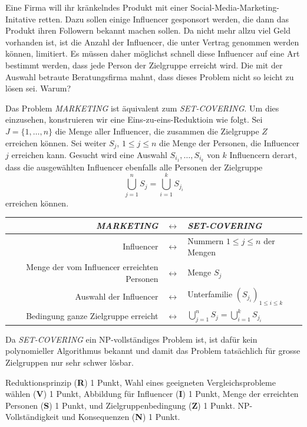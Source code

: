 Eine Firma will ihr kränkelndes Produkt mit einer
Social-Media-Marketing-Initative retten.
Dazu sollen einige Influencer gesponsort werden, die dann das Produkt
ihren Followern bekannt machen sollen.
Da nicht mehr allzu viel Geld vorhanden ist, ist die Anzahl der
Influencer, die unter Vertrag genommen werden können, limitiert.
Es müssen daher möglichst schnell diese Influencer
auf eine Art bestimmt werden, dass jede Person der Zielgruppe erreicht wird.
Die mit der Auswahl betraute Beratungsfirma mahnt, dass dieses
Problem nicht so leicht zu lösen sei.
Warum?

\begin{loesung}
Das Problem \textit{MARKETING} ist äquivalent zum \textit{SET-COVERING}.
Um dies einzusehen, konstruieren wir eine Eins-zu-eins-Reduktioin wie
folgt.
Sei $J=\{1,\dots,n\}$ die Menge aller Influencer,
die zusammen die Zielgruppe $Z$ erreichen können.
Sei weiter $S_j$, $1\le j\le n$ die Menge der Personen, die Influencer $j$
erreichen kann.
Gesucht wird eine Auswahl $S_{i_1},\dots,S_{i_k}$ von $k$ Influencern
derart, dass die ausgewählten Influencer ebenfalls alle Personen der
Zielgruppe
\[
\bigcup_{j=1}^n S_j
= 
\bigcup_{i=1}^k S_{j_i}
\]
erreichen können.
\begin{center}
\begin{tabular}{r>{$}c<{$}l}
\textit{MARKETING}&\leftrightarrow&\textit{SET-COVERING} \\
\hline
Influencer&\leftrightarrow&Nummern $1\le j\le n$ der Mengen \\
Menge der vom Influencer erreichten Personen&\leftrightarrow&Menge $S_j$ \\
Auswahl der Influencer&\leftrightarrow&Unterfamilie $(S_{j_i})_{1\le i\le k}$ \\
Bedingung ganze Zielgruppe erreicht&\leftrightarrow&
$\bigcup_{j=1}^n S_j = \bigcup_{i=1}^k S_{j_i}$
\end{tabular}
\end{center}
Da \textit{SET-COVERING} ein NP-vollständiges Problem ist, ist dafür kein 
polynomieller Algorithmus bekannt und damit das Problem tatsächlich 
für grosse Zielgruppen nur sehr schwer lösbar.
\end{loesung}

\begin{bewertung}
Reduktionsprinzip ({\bf R}) 1 Punkt,
Wahl eines geeigneten Vergleichsprobleme wählen ({\bf V}) 1 Punkt,
Abbildung für Influencer ({\bf I}) 1 Punkt,
Menge der erreichten Personen ({\bf S}) 1 Punkt,
und Zielgruppenbedingung ({\bf Z}) 1 Punkt.
NP-Vollständigkeit und Konsequenzen ({\bf N}) 1 Punkt.
\end{bewertung}

